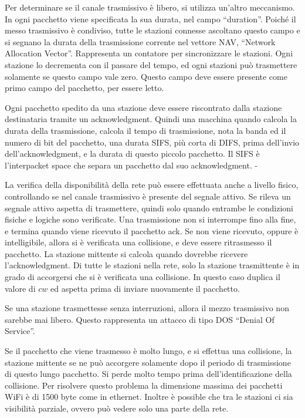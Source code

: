 \documentclass{article}
\numberwithin{equation}{subsection}
\begin{document}



Per determinare se il canale trasmissivo è libero, si utilizza un'altro meccanismo. In ogni pacchetto viene specificata la sua durata, nel campo ``duration''. Poiché 
il messo trasmissivo è condiviso, tutte le stazioni connesse ascoltano questo campo e si segnano la durata della trasmissione corrente nel vettore NAV, ``Network 
Allocation Vector''. Rappresenta un contatore per sincronizzare le stazioni. Ogni stazione lo decrementa con il passare del tempo, ed ogni stazioni può trasmettere 
solamente se questo campo vale zero. Questo campo deve essere presente come primo campo del pacchetto, per essere letto. 


Ogni pacchetto spedito da una stazione deve essere riscontrato dalla stazione destinataria tramite un acknowledgment. Quindi una macchina quando calcola la durata 
della trasmissione, calcola il tempo di trasmissione, nota la banda ed il numero di bit del pacchetto, una durata SIFS, più corta di DIFS, prima dell'invio 
dell'acknowledgment, e la durata di questo piccolo pacchetto. Il SIFS è l'interpacket space che separa un pacchetto dal suo acknowledgment. -


La verifica della disponibilità della rete può essere effettuata anche a livello fisico, controllando se nel canale trasmissivo è presente del segnale attivo. Se 
rileva un segnale attivo aspetta di trasmettere, quindi solo quando entrambe le condizioni fisiche e logiche sono verificate. 
Una trasmissione non si interrompe fino alla fine, e termina quando viene ricevuto il pacchetto ack. Se non viene ricevuto, oppure è intelligibile, allora si è verificata 
una collisione, e deve essere ritrasmesso il pacchetto. La stazione mittente si calcola quando dovrebbe ricevere l'acknowledgment. 
Di tutte le stazioni nella rete, solo la stazione trasmittente è in grado di accorgersi che si è verificata una collisione. In questo caso duplica il valore di $cw$ ed 
aspetta prima di inviare nuovamente il pacchetto.  

Se una stazione trasmettesse senza interruzioni, allora il mezzo trasmissivo non sarebbe mai libero. Questo rappresenta un attacco di tipo DOS ``Denial Of Service''. 


Se il pacchetto che viene trasmesso è molto lungo, e si effettua una collisione, la stazione mittente se ne può accorgere solamente dopo il periodo di trasmissione di 
questo lungo pacchetto. Si perde molto tempo prima dell'identificazione della collisione. 
Per risolvere questo problema la dimensione massima dei pacchetti WiFi è di 1500 byte come in ethernet. 
Inoltre è possible che tra le stazioni ci sia visibilità parziale, ovvero può vedere solo una parte della rete. 
\end{document}
